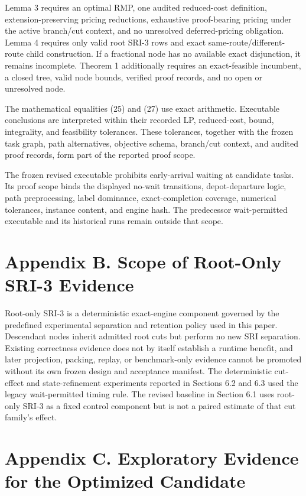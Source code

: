 \documentclass[
  11pt,
]{article}
\begin{document}
Lemma 3 requires an optimal RMP, one audited reduced-cost definition,
extension-preserving pricing reductions, exhaustive proof-bearing
pricing under the active branch/cut context, and no unresolved
deferred-pricing obligation. Lemma 4 requires only valid root SRI-3 rows
and exact same-route/different-route child construction. If a fractional
node has no available exact disjunction, it remains incomplete. Theorem
1 additionally requires an exact-feasible incumbent, a closed tree,
valid node bounds, verified proof records, and no open or unresolved
node.

The mathematical equalities (25) and (27) use exact arithmetic.
Executable conclusions are interpreted within their recorded LP,
reduced-cost, bound, integrality, and feasibility tolerances. These
tolerances, together with the frozen task graph, path alternatives,
objective schema, branch/cut context, and audited proof records, form
part of the reported proof scope.

The frozen revised executable prohibits early-arrival waiting at
candidate tasks. Its proof scope binds the displayed no-wait
transitions, depot-departure logic, path preprocessing, label dominance,
exact-completion coverage, numerical tolerances, instance content, and
engine hash. The predecessor wait-permitted executable and its
historical runs remain outside that scope.

\hypertarget{appendix-b.-scope-of-root-only-sri-3-evidence}{%
\section{Appendix B. Scope of Root-Only SRI-3
Evidence}\label{appendix-b.-scope-of-root-only-sri-3-evidence}}

Root-only SRI-3 is a deterministic exact-engine component governed by
the predefined experimental separation and retention policy used in this
paper. Descendant nodes inherit admitted root cuts but perform no new
SRI separation. Existing correctness evidence does not by itself
establish a runtime benefit, and later projection, packing, replay, or
benchmark-only evidence cannot be promoted without its own frozen design
and acceptance manifest. The deterministic cut-effect and
state-refinement experiments reported in Sections 6.2 and 6.3 used the
legacy wait-permitted timing rule. The revised baseline in Section 6.1
uses root-only SRI-3 as a fixed control component but is not a paired
estimate of that cut family's effect.

\hypertarget{appendix-c.-exploratory-evidence-for-the-optimized-candidate}{%
\section{Appendix C. Exploratory Evidence for the Optimized
Candidate}\label{appendix-c.-exploratory-evidence-for-the-optimized-candidate}}
\end{document}
